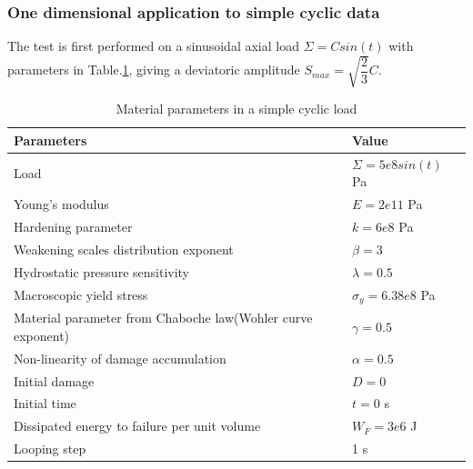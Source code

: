 \documentclass[3p,times,procedia,number]{elsarticle}
\begin{document}
\subsubsection{One dimensional application to simple cyclic data}
The test is first performed on a sinusoidal axial load $\Sigma=Csin(t)$ with parameters in Table.\ref{Sin}, giving a deviatoric amplitude $S_{max}=\sqrt{\dfrac{2}{3}}C$.
\begin{table}[!h]
	\centering
	\begin{tabular}{ll}
		\hline
		\textbf{Parameters}                                         & \textbf{Value}                    \\ \hline
		Load                                                              & $\Sigma=5e8sin(t)$ Pa                  \\
		Young's modulus                                             & $E=2e11$ Pa                       \\
		Hardening parameter                                         &  $k=6e8$ Pa \\
		Weakening scales distribution exponent                      & $\beta=3$                             \\
		Hydrostatic pressure sensitivity                            & $\lambda=0.5$                     \\
		Macroscopic yield stress                                    & $\sigma_y=6.38e8$ Pa              \\
		Material parameter from Chaboche law(Wohler curve exponent) & $\gamma=0.5$                        \\
		Non-linearity of damage accumulation & $\alpha=0.5$                        \\
		Initial damage                                              & $D=0$                          \\
		Initial time                                                & $t=0$ s                            \\
		Dissipated energy to failure per unit volume                & $W_F=3e6$ J                       \\
		Looping step                                           & 1 s              \\ \hline
	\end{tabular}
	\caption{Material parameters in a simple cyclic load }
	\label{Sin}
\end{table}
\end{document}
